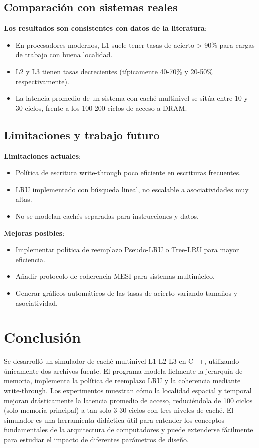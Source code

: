 \documentclass[12pt, letterpaper]{article}
\begin{document}
\subsection{Comparación con sistemas reales}

\textbf{Los resultados son consistentes con datos de la literatura}:
\begin{itemize}
    \item En procesadores modernos, L1 suele tener tasas de acierto > 90\% para cargas de trabajo con buena localidad.
    \item L2 y L3 tienen tasas decrecientes (típicamente 40-70\% y 20-50\% respectivamente).
    \item La latencia promedio de un sistema con caché multinivel se sitúa entre 10 y 30 ciclos, frente a los 100-200 ciclos de acceso a DRAM.
\end{itemize}

\subsection{Limitaciones y trabajo futuro}

\textbf{Limitaciones actuales}:
\begin{itemize}
    \item Política de escritura write-through poco eficiente en escrituras frecuentes.
    \item LRU implementado con búsqueda lineal, no escalable a asociatividades muy altas.
    \item No se modelan cachés separadas para instrucciones y datos.
\end{itemize}

\textbf{Mejoras posibles}:
\begin{itemize}
    \item Implementar política de reemplazo Pseudo-LRU o Tree-LRU para mayor eficiencia.
    \item Añadir protocolo de coherencia MESI para sistemas multinúcleo.
    \item Generar gráficos automáticos de las tasas de acierto variando tamaños y asociatividad.
\end{itemize}

\section{Conclusión}

Se desarrolló un simulador de caché multinivel L1-L2-L3 en C++, utilizando únicamente dos archivos fuente. El programa modela fielmente la jerarquía de memoria, implementa la política de reemplazo LRU y la coherencia mediante write-through. Los experimentos muestran cómo la localidad espacial y temporal mejoran drásticamente la latencia promedio de acceso, reduciéndola de 100 ciclos (solo memoria principal) a tan solo 3-30 ciclos con tres niveles de caché. El simulador es una herramienta didáctica útil para entender los conceptos fundamentales de la arquitectura de computadores y puede extenderse fácilmente para estudiar el impacto de diferentes parámetros de diseño.
\end{document}
